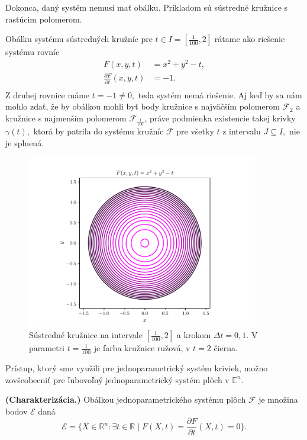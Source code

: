 Dokonca, daný systém nemusí mať obálku. Príkladom sú sústredné kružnice s rastúcim polomerom.
\begin{example} 
Obálku systému sústredných kružníc pre $t \in I=[\frac{1}{100},2]$ rátame ako riešenie systému rovníc
\begin{align*}
F(x, y, t) &= x^2 + y^2 - t, \\
\frac{\partial F}{\partial t}(x,y,t) &= -1. \\
\end{align*}
Z druhej rovnice máme $t=-1 \neq 0,$ teda systém nemá riešenie. Aj keď by sa nám mohlo zdať, že by obálkou mohli byť body kružnice s najväčším polomerom $\mathcal{F}_2$ a kružnice s najmenším polomerom $\mathcal{F}_{\frac{1}{100}}$, práve podmienka existencie takej krivky $\gamma(t),$ ktorá by patrila do systému kružníc $\mathcal{F}$ pre všetky $t$ z intervalu $J \subseteq  I, $ nie je splnená.
\end{example}
\begin{figure}[h]
	\centering
	\includegraphics[trim={0 0.35cm 0 0.85cm},clip, width=0.9\textwidth]{images/concentric_circles.pdf}
	\caption[Sústredné kružnice.]{Sústredné kružnice na intervale $[\frac{1}{100},2]$ a krokom $\Delta t = 0,1$. V parametri $t = \frac{1}{100} $ je farba kružnice ružová, v $ t = 2 $ čierna.}
	\label{fig:concentric_circles}
\end{figure}
Prístup, ktorý sme využili pre jednoparametrický systém kriviek, možno zovšeobecniť pre ľubovoľný jednoparametrický systém plôch v $\mathbb{E}^n.$
\begin{definition}{\textbf{\textup{(Charakterizácia.)}}}
\label{charakterizacia}
Obálkou jednoparametrického systému plôch $ \mathcal{F} $ je množina bodov $\mathcal{E}$ daná
$$\mathcal{E} = \{ X \in \mathbb{R}^{n} \colon \exists t \in \mathbb{R} \mid F(X, t) = \frac{\partial F}{\partial t}(X, t) = 0 \}.$$
\end{definition}
